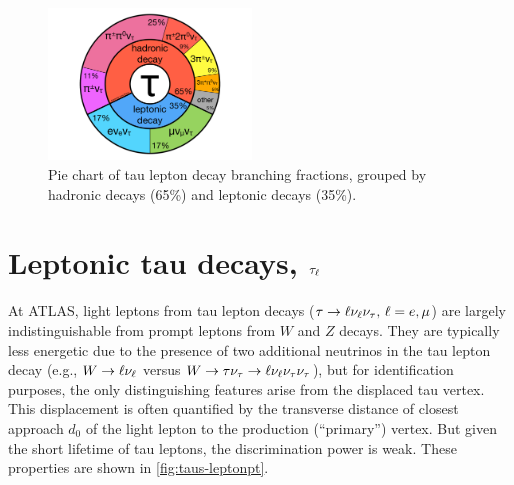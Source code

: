 \begin{figure}[tp]
  \centering
  \includegraphics[width=0.48\textwidth]{figures/piecharts/taudecay}
  \caption{Pie chart of tau lepton decay branching fractions, grouped by hadronic decays (65\%) and leptonic decays (35\%).}
  \label{fig:taus-decaypie}
\end{figure}


\section{Leptonic tau decays, $\tau_\ell$}
\label{sec:taus-leptons}

At ATLAS, light leptons from tau lepton decays ($\tau \rightarrow \ell\nu_\ell\nu_\tau \text{, } \ell = e,\mu$) are largely indistinguishable from prompt leptons from $W$ and $Z$ decays. They are typically less energetic due to the presence of two additional neutrinos in the tau lepton decay (e.g., $W \rightarrow \ell\nu_\ell$ versus $W \rightarrow \tau\nu_\tau \rightarrow \ell\nu_\ell\nu_\tau\nu_\tau$), but for identification purposes, the only distinguishing features arise from the displaced tau vertex. This displacement is often quantified by the transverse distance of closest approach $d_0$ of the light lepton to the production (``primary'') vertex. But given the short lifetime of tau leptons, the discrimination power is weak. These properties are shown in \cref{fig:taus-leptonpt}.

